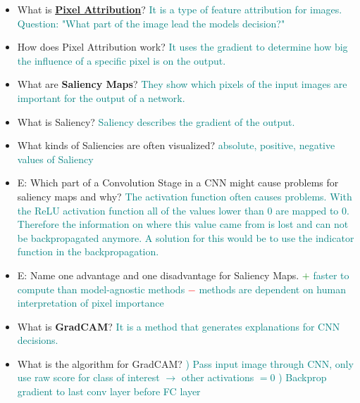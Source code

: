 \documentclass{report}
\newcommand{\asw}[2][teal]{}
\renewcommand{\asw}[2][teal]{\textcolor{#1}{#2}}
\begin{document}
\begin{itemize}
		\item What is \textbf{\underline{Pixel Attribution}}?
		\asw{\newline It is a type of feature attribution for images.
			\newline Question: "What part of the image lead the models decision?"}
		\item How does Pixel Attribution work?
		\asw{\newline It uses the gradient to determine how big the influence of a specific pixel is on the output.}
		\item What are \textbf{Saliency Maps}?
		\asw{\newline They show which pixels of the input images are important for the output of a network.}
		\item What is Saliency?
		\asw{\newline Saliency describes the gradient of the output.}
		\item What kinds of Saliencies are often visualized?
		\asw{\newline absolute, positive, negative values of Saliency}
		\item E: Which part of a Convolution Stage in a CNN might cause problems for saliency maps and why?
		\asw{\newline The activation function often causes problems. With the ReLU activation function all of the values lower than 0 are mapped to 0. Therefore the information on where this value came from is lost and can not be backpropagated anymore.
			\newline A solution for this would be to use the indicator function in the backpropagation.}
		\item E: Name one advantage and one disadvantage for Saliency Maps.
		\asw{\newline \textcolor{green}{$+$} faster to compute than model-agnostic methods
			\newline \textcolor{red}{$-$} methods are dependent on human interpretation of pixel importance}
		\item What is \textbf{GradCAM}?
		\asw{\newline It is a method that generates explanations for CNN decisions.}
		\item What is the algorithm for GradCAM?
		\asw{) Pass input image through CNN, only use raw score for class of interest $\rightarrow$ other activations $=0$
			\newline 2) Backprop gradient to last conv layer before FC layer
}
\end{itemize}
\end{document}
